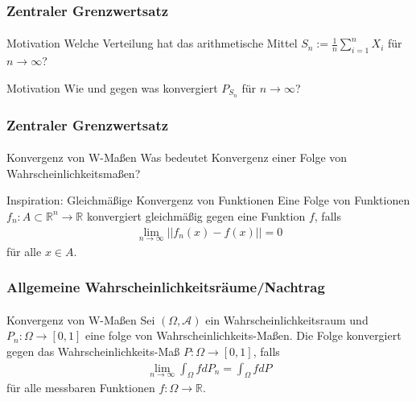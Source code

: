 \documentclass{beamer}
\begin{document}
\begin{frame}
    \frametitle{Zentraler Grenzwertsatz}
\framesubtitle{}

\begin{block}{Motivation}
Welche Verteilung hat das arithmetische Mittel $S_n:= \frac{1}{n} \sum_{i=1}^n X_i$ für $n \to \infty$?
\end{block}
\begin{block}{Motivation}
Wie und gegen was konvergiert $P_{S_n}$ für $n \to \infty$?
\end{block}

 \end{frame}



\begin{frame}
    \frametitle{Zentraler Grenzwertsatz}
\framesubtitle{}

\begin{block}{Konvergenz von W-Maßen}
Was bedeutet Konvergenz einer Folge von Wahrscheinlichkeitsmaßen?
\end{block}
\begin{block}{Inspiration: Gleichmäßige Konvergenz von Funktionen}
Eine Folge von Funktionen $f_n: A \subset \mathbb{R}^n \to \mathbb{R}$ konvergiert gleichmäßig gegen eine Funktion $f$, falls 
\begin{align*}
\lim_{n \to \infty} ||f_n(x) -f(x) || = 0
\end{align*}
für alle $x \in A$.
\end{block}

 \end{frame}

\begin{frame}
    \frametitle{Allgemeine Wahrscheinlichkeitsräume/Nachtrag}
\framesubtitle{}

\begin{block}{Konvergenz von W-Maßen}
Sei $(\Omega, \mathcal{A})$ ein Wahrscheinlichkeitsraum und $P_n : \Omega \to [0,1]$ eine folge von Wahrscheinlichkeits-Maßen. Die Folge konvergiert gegen
das Wahrscheinlichkeits-Maß $P: \Omega \to [0,1]$, falls 
\begin{align*}
\lim_{n \to \infty} \int_\Omega f dP_n = \int_\Omega f dP
\end{align*}
für alle messbaren Funktionen $f: \Omega \to \mathbb{R}$.
\end{block}
 \end{frame}
\end{document}
